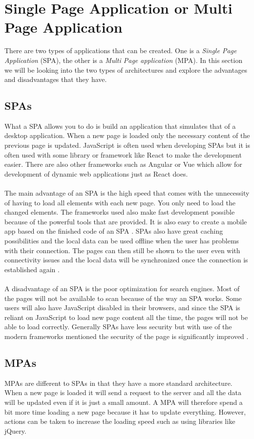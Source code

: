 \section{Single Page Application or Multi Page Application}
There are two types of applications that can be created.
One is a \textit{Single Page Application} (SPA), the other is a \textit{Multi Page application} (MPA).
In this section we will be looking into the two types of architectures and explore the advantages and disadvantages that they have.

\subsection{SPAs}
What a SPA allows you to do is build an application that simulates that of a desktop application. 
When a new page is loaded only the necessary content of the previous page is updated.
JavaScript is often used when developing SPAs but it is often used with some library or framework like React to make the development easier.
There are also other frameworks such as Angular or Vue which allow for development of dynamic web applications just as React does. 
\\\\
The main advantage of an SPA is the high speed that comes with the unnecessity of having to load all elements with each new page.
You only need to load the changed elements. 
The frameworks used also make fast development possible because of the powerful tools that are provided. 
It is also easy to create a mobile app based on the finished code of an SPA \cite{SPAvsMPAMerehead}.
SPAs also have great caching possibilities and the local data can be used offline when the user has problems with their connection. 
The pages can then still be shown to the user even with connectivity issues and the local data will be synchronized once the connection is established again \cite{SPAvsMPARuby}.
\\\\
A disadvantage of an SPA is the poor optimization for search engines.
Most of the pages will not be available to scan because of the way an SPA works. 
Some users will also have JavaScript disabled in their browsers, and since the SPA is reliant on JavaScript to load new page content all the time, the pages will not be able to load correctly.
Generally SPAs have less security but with use of the modern frameworks mentioned the security of the page is significantly improved \cite{SPAvsMPAMerehead}.

\subsection{MPAs}
MPAs are different to SPAs in that they have a more standard architecture.
When a new page is loaded it will send a request to the server and all the data will be updated even if it is just a small amount.
A MPA will therefore spend a bit more time loading a new page because it has to update everything.
However, actions can be taken to increase the loading speed such as using libraries like jQuery.

